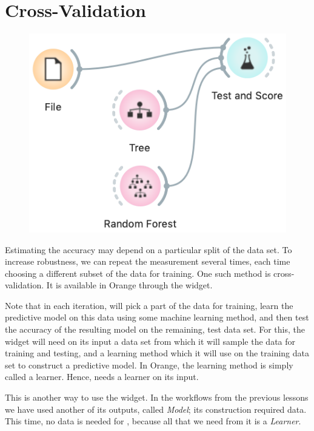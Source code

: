 \chapter{Cross-Validation}

\begin{figure}
    \vspace{-0.5cm}
    \includegraphics[scale=0.4]{workflow.png}
\end{figure}

Estimating the accuracy may depend on a particular split of the data set. To increase robustness, we can repeat the measurement several times, each time choosing a different subset of the data for training. One such method is cross-validation. It is available in Orange through the  widget.

Note that in each iteration,  will pick a part of the data for training, learn the predictive model on this data using some machine learning method, and then test the accuracy of the resulting model on the remaining, test data set. For this, the widget will need on its input a data set from which it will sample the data for training and testing, and a learning method which it will use on the training data set to construct a predictive model. In Orange, the learning method is simply called a learner. Hence,  needs a learner on its input. 

This is another way to use the  widget. In the workflows from the previous lessons we have used another of its outputs, called \textit{Model}; its construction required data. This time, no data is needed for , because all that we need from it is a \textit{Learner}.

